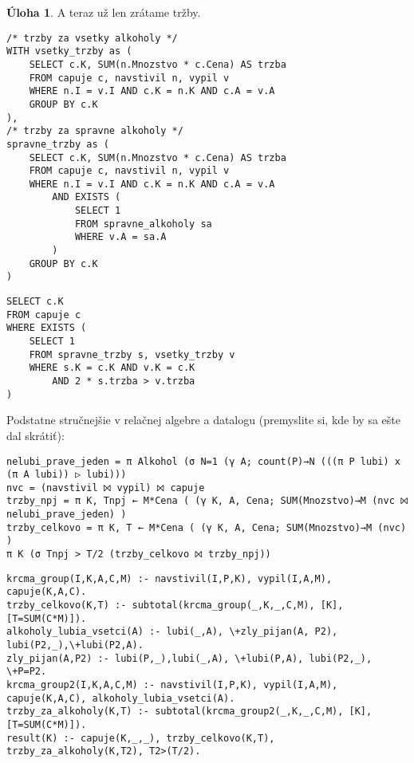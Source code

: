 \documentclass[10pt, a4paper]{article}
\theoremstyle{definition}
\newtheorem{problem}{Úloha}[section]
\begin{document}
\begin{problem}
A teraz už len zrátame tržby.

\begin{minipage}[t]{0.6\textwidth}
\begin{verbatim}
/* trzby za vsetky alkoholy */
WITH vsetky_trzby as (
    SELECT c.K, SUM(n.Mnozstvo * c.Cena) AS trzba
    FROM capuje c, navstivil n, vypil v
    WHERE n.I = v.I AND c.K = n.K AND c.A = v.A
    GROUP BY c.K
),
/* trzby za spravne alkoholy */
spravne_trzby as (
    SELECT c.K, SUM(n.Mnozstvo * c.Cena) AS trzba
    FROM capuje c, navstivil n, vypil v
    WHERE n.I = v.I AND c.K = n.K AND c.A = v.A
        AND EXISTS (
            SELECT 1
            FROM spravne_alkoholy sa
            WHERE v.A = sa.A
        )
    GROUP BY c.K
)
\end{verbatim}
\end{minipage}
\begin{minipage}[t]{0.4\textwidth}
\begin{verbatim}
SELECT c.K
FROM capuje c
WHERE EXISTS (
    SELECT 1
    FROM spravne_trzby s, vsetky_trzby v
    WHERE s.K = c.K AND v.K = c.K 
        AND 2 * s.trzba > v.trzba
)
\end{verbatim}
\end{minipage}

\medskip

Podstatne stručnejšie v relačnej algebre a datalogu (premyslite si, kde by sa ešte dal skrátiť):
\begin{verbatim}
nelubi_prave_jeden = π Alkohol (σ N=1 (γ A; count(P)→N (((π P lubi) x (π A lubi)) ▷ lubi)))
nvc = (navstivil ⨝ vypil) ⨝ capuje
trzby_npj = π K, Tnpj ← M*Cena ( (γ K, A, Cena; SUM(Mnozstvo)→M (nvc ⨝ nelubi_prave_jeden) )
trzby_celkovo = π K, T ← M*Cena ( (γ K, A, Cena; SUM(Mnozstvo)→M (nvc) )
π K (σ Tnpj > T/2 (trzby_celkovo ⨝ trzby_npj))
\end{verbatim}

\begin{verbatim}
krcma_group(I,K,A,C,M) :- navstivil(I,P,K), vypil(I,A,M), capuje(K,A,C).
trzby_celkovo(K,T) :- subtotal(krcma_group(_,K,_,C,M), [K], [T=SUM(C*M)]).
alkoholy_lubia_vsetci(A) :- lubi(_,A), \+zly_pijan(A, P2), lubi(P2,_),\+lubi(P2,A).
zly_pijan(A,P2) :- lubi(P,_),lubi(_,A), \+lubi(P,A), lubi(P2,_), \+P=P2.
krcma_group2(I,K,A,C,M) :- navstivil(I,P,K), vypil(I,A,M), capuje(K,A,C), alkoholy_lubia_vsetci(A).
trzby_za_alkoholy(K,T) :- subtotal(krcma_group2(_,K,_,C,M), [K], [T=SUM(C*M)]).
result(K) :- capuje(K,_,_), trzby_celkovo(K,T), trzby_za_alkoholy(K,T2), T2>(T/2).
\end{verbatim}
\end{problem}
\end{document}

